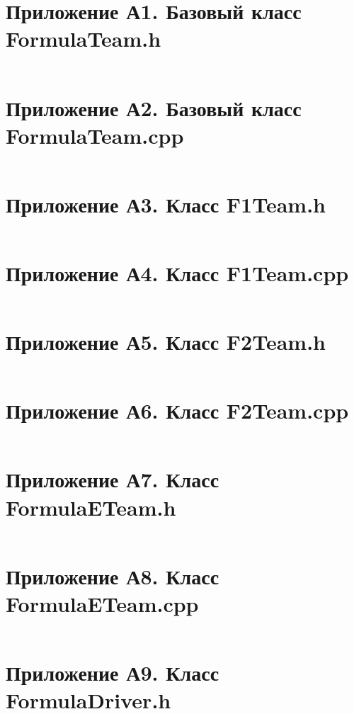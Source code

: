 \documentclass[oneside,a4paper,14pt]{extarticle}
\begin{document}
\newpage

\section*{Приложение А1. Базовый класс FormulaTeam.h}
\inputminted{cpp}{code/src/core/FormulaTeam.h}

\section*{Приложение А2. Базовый класс FormulaTeam.cpp}
\inputminted{cpp}{code/src/core/FormulaTeam.cpp}

\section*{Приложение А3. Класс F1Team.h}
\inputminted{cpp}{code/src/core/F1Team.h}

\section*{Приложение А4. Класс F1Team.cpp}
\inputminted{cpp}{code/src/core/F1Team.cpp}

\section*{Приложение А5. Класс F2Team.h}
\inputminted{cpp}{code/src/core/F2Team.h}

\section*{Приложение А6. Класс F2Team.cpp}
\inputminted{cpp}{code/src/core/F2Team.cpp}

\section*{Приложение А7. Класс FormulaETeam.h}
\inputminted{cpp}{code/src/core/FormulaETeam.h}

\section*{Приложение А8. Класс FormulaETeam.cpp}
\inputminted{cpp}{code/src/core/FormulaETeam.cpp}

\section*{Приложение А9. Класс FormulaDriver.h}
\inputminted{cpp}{code/src/core/FormulaDriver.h}
\end{document}
